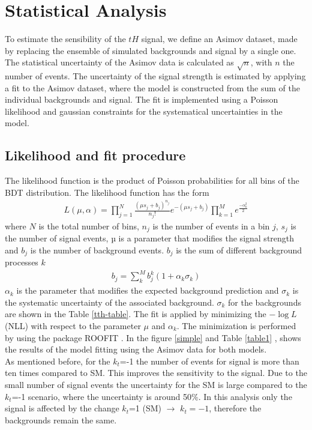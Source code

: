 \chapter{Statistical Analysis}
\begin{linenumbers}
	To estimate the sensibility of the $tH$ signal, we define an Asimov dataset, made by replacing the ensemble of simulated backgrounds and signal by a single one. The statistical uncertainty of the Asimov data is calculated as $\sqrt{n}$, with $n$ the number of events. The uncertainty of the signal strength is estimated by applying a  fit to the Asimov dataset, where the model
	is constructed from the sum of the individual backgrounds and signal. The fit is implemented using a Poisson likelihood and gaussian constraints for the systematical uncertainties in the model.
	
	
	\section{Likelihood and fit procedure}
	The likelihood function is the product of Poisson probabilities for all bins of the BDT distribution. The likelihood function has the form
	\begin{align}
		L(\mu,\alpha)=\prod_{j=1}^{N}\frac{(\mu s_j +b_j)^{n_j}}{n_j !}e^{-(\mu s_j+b_j)} \prod_{k=1}^M e^{\frac{-\alpha^2_k}{2}}
	\end{align}
	where $N$ is the total number of bins, $n_j$ is the number of events in a bin $j$,  $s_j$ is the number of signal events, µ is a parameter that modifies the signal strength and  $b_j$ is the number of background events.
	$b_j$ is the sum of different background processes $k$
	\begin{align}
		b_j=\sum_k^M b_j^k(1+ \alpha_k \sigma_k)
	\end{align}
	$\alpha_k$ is the parameter that modifies the expected background prediction and $\sigma_k$ is the systematic uncertainty of the associated background. $\sigma_k$ for the backgrounds are shown in the Table \ref{tth-table}.
	The fit is applied by minimizing the $-\log{L}$ (NLL) with respect to the parameter $\mu$ and $\alpha_k$. The minimization is performed by using the package ROOFIT \cite{roofit}. In the figure \ref{simple} and Table \ref{table1} , shows the results of the model fitting using the Asimov data for both models.  \\
	As mentioned before, for the $k_t$=-1 the number of events for signal is more than ten times compared to SM. This improves the sensitivity to the signal. Due to the small number of signal events the uncertainty for the SM is large compared to the $k_t$=-1 scenario, where the uncertainty is around 50$\%$. In this analysis only the signal is affected by the change $k_t$=1 (SM) $\rightarrow$  $k_t=-1$, therefore the backgrounds remain the same.
	

\end{linenumbers}
